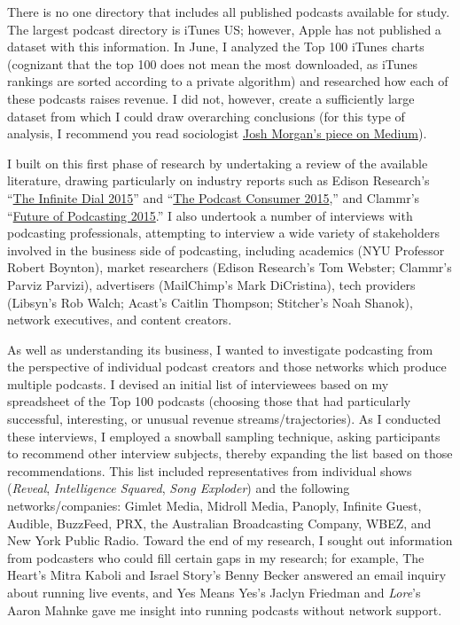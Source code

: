 \documentclass[notoc, symmetric, nobib, nols]{towcenter-guideto-book}
\begin{document}
There is no one directory that includes all published podcasts available for study. The largest podcast directory is iTunes US; however, Apple has not published a dataset with this information. In June, I analyzed the Top 100 iTunes charts (cognizant that the top 100 does not mean the most downloaded, as iTunes rankings are sorted according to a private algorithm) and researched how each of these podcasts raises revenue. I did not, however, create a sufficiently large dataset from which I could draw overarching conclusions (for this type of analysis, I recommend you read sociologist \href{https://medium.com/@slowerdawn/how-podcasts-have-changed-in-ten-years-by-the-numbers-720a6e984e4e}{Josh Morgan's piece on Medium}\autocite{morgan}).

I built on this first phase of research by undertaking a review of the available literature, drawing particularly on industry reports such as Edison Research's ``\href{http://www.edisonresearch.com/the-infinite-dial-2015/}{The Infinite Dial 2015}'' and ``\href{http://www.edisonresearch.com/the-podcast-consumer-2015/}{The Podcast Consumer 2015},'' and Clammr's ``\href{http://www.slideshare.net/clammrapp/20150617-future-of-podcasting-2015-clammr-v-f}{Future of Podcasting 2015}.'' I also undertook a number of interviews with podcasting professionals, attempting to interview a wide variety of stakeholders involved in the business side of podcasting, including academics (NYU Professor Robert Boynton), market researchers (Edison Research's Tom Webster; Clammr's Parviz Parvizi), advertisers (MailChimp's Mark DiCristina), tech providers (Libsyn's Rob Walch; Acast's Caitlin Thompson; Stitcher's Noah Shanok), network executives, and content creators. 

As well as understanding its business, I wanted to investigate podcasting from the perspective of individual podcast creators and those networks which produce multiple podcasts. I devised an initial list of interviewees based on my spreadsheet of the Top 100 podcasts (choosing those that had particularly successful, interesting, or unusual revenue streams/trajectories). As I conducted these interviews, I employed a snowball sampling technique, asking participants to recommend other interview subjects, thereby expanding the list based on those recommendations. This list included representatives from individual shows (\textit{Reveal}, \textit{Intelligence Squared}, \textit{Song Exploder}) and the following networks/companies: Gimlet Media, Midroll Media, Panoply, Infinite Guest, Audible, BuzzFeed, PRX, the Australian Broadcasting Company, WBEZ, and New York Public Radio. Toward the end of my research, I sought out information from podcasters who could fill certain gaps in my research; for example, The Heart's Mitra Kaboli and Israel Story's Benny Becker answered an email inquiry about running live events, and Yes Means Yes's Jaclyn Friedman and \textit{Lore}'s Aaron Mahnke gave me insight into running podcasts without network support. 
\end{document}
